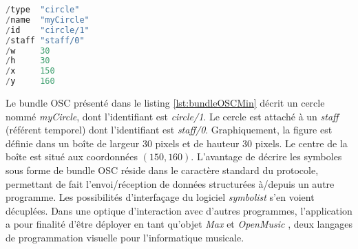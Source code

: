 \begin{lstlisting}[language=java, 
				   caption={Messages OSC \'{e}l\'{e}mentaires pour les symboles d'une partition \textit{symbolist}}, 
				   label={lst:bundleOSCMin}, 
				   captionpos={b}, 
				   numbers=none]
/type  "circle"
/name  "myCircle"
/id    "circle/1"
/staff "staff/0"
/w     30
/h     30
/x     150
/y     160 
\end{lstlisting}

Le bundle OSC présenté dans le listing \ref{lst:bundleOSCMin} décrit un cercle nommé \textit{myCircle}, dont l'identifiant est \textit{circle/1}. Le cercle est attaché à un \textit{staff} (référent temporel) dont l'identifiant est \textit{staff/0}. Graphiquement, la figure est définie dans un boîte de largeur 30 pixels et de hauteur 30 pixels. Le centre de la boîte est situé aux coordonnées $(150, 160)$.
L'avantage de décrire les symboles sous forme de bundle OSC réside dans le caractère standard du protocole, permettant de fait l'envoi/réception de données structurées à/depuis un autre programme. Les possibilités d'interfaçage du logiciel \textit{symbolist} s'en voient décuplées.
Dans une optique d'interaction avec d'autres programmes, l'application a pour finalité d'être déployer en tant qu'objet \textit{Max} \cite{puckette1991} et \textit{OpenMusic} \cite{agon1998}, deux langages de programmation visuelle pour l'informatique musicale.